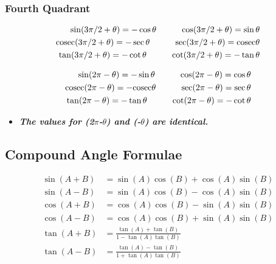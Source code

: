 \subsubsection{Fourth Quadrant}

\begin{align*}
\sin(3\pi/2 + \theta) = -\cos\theta \hspace{10mm} \cos(3\pi/2 + \theta) = \sin\theta \\
\mathrm{cosec}(3\pi/2 + \theta) = -\sec\theta \hspace{10mm} \sec(3\pi/2 + \theta) = \mathrm{cosec}\theta \\
\tan(3\pi/2 + \theta) = -\cot\theta \hspace{10mm} \cot(3\pi/2 + \theta) = -\tan\theta 
\end{align*}

\begin{align*}
\sin(2\pi - \theta) = -\sin\theta \hspace{10mm} \cos(2\pi - \theta) = \cos\theta \\
\mathrm{cosec}(2\pi - \theta) = -\mathrm{cosec}\theta \hspace{10mm} \sec(2\pi - \theta) = \sec\theta \\
\tan(2\pi - \theta) = -\tan\theta \hspace{10mm} \cot(2\pi - \theta) = -\cot\theta 
\end{align*}

\begin{itemize}
\item \textit{\textbf{The values for (2$\pi$-$\theta$) and (-$\theta$) are identical.}}
\end{itemize}

\subsection{Compound Angle Formulae}
\begin{align*}
\sin(A+B) &= \sin(A) \cos(B) + \cos(A) \sin(B)\\ 
\sin(A-B) &= \sin(A) \cos(B) - \cos(A) \sin(B)\\ 
\cos(A+B) &= \cos(A) \cos(B) - \sin(A) \sin(B)\\ 
\cos(A-B) &= \cos(A) \cos(B) + \sin(A) \sin(B)\\ 
\tan(A+B) &= \frac{\tan(A) + \tan(B)}{1 -\tan(A)\tan(B)}\\
\tan(A-B) &= \frac{\tan(A) - \tan(B)}{1 +\tan(A)\tan(B)} 
\end{align*}

